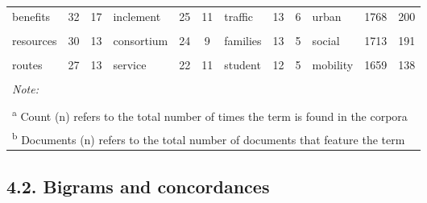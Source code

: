 \documentclass[]{elsarticle} %
\begin{document}
\begin{table}
{\begin{tabular}[t]{lcclcclcclcc}
benefits & 32 & 17 & inclement & 25 & 11 & traffic & 13 & 6 & urban & 1768 & 200\\
\addlinespace
\cellcolor{gray!6}{play} & \cellcolor{gray!6}{31} & \cellcolor{gray!6}{2} & \cellcolor{gray!6}{eligibility} & \cellcolor{gray!6}{24} & \cellcolor{gray!6}{11} & \cellcolor{gray!6}{support} & \cellcolor{gray!6}{13} & \cellcolor{gray!6}{6} & \cellcolor{gray!6}{home} & \cellcolor{gray!6}{1715} & \cellcolor{gray!6}{199}\\
resources & 30 & 13 & consortium & 24 & 9 & families & 13 & 5 & social & 1713 & 191\\
\cellcolor{gray!6}{healthy} & \cellcolor{gray!6}{29} & \cellcolor{gray!6}{16} & \cellcolor{gray!6}{region} & \cellcolor{gray!6}{23} & \cellcolor{gray!6}{10} & \cellcolor{gray!6}{way} & \cellcolor{gray!6}{12} & \cellcolor{gray!6}{5} & \cellcolor{gray!6}{different} & \cellcolor{gray!6}{1713} & \cellcolor{gray!6}{215}\\
routes & 27 & 13 & service & 22 & 11 & student & 12 & 5 & mobility & 1659 & 138\\
\cellcolor{gray!6}{lanes} & \cellcolor{gray!6}{26} & \cellcolor{gray!6}{3} & \cellcolor{gray!6}{•} & \cellcolor{gray!6}{21} & \cellcolor{gray!6}{1} & \cellcolor{gray!6}{region} & \cellcolor{gray!6}{12} & \cellcolor{gray!6}{4} & \cellcolor{gray!6}{significant} & \cellcolor{gray!6}{1650} & \cellcolor{gray!6}{208}\\
\bottomrule
\multicolumn{12}{l}{\rule{0pt}{1em}\textit{Note: }}\\
\multicolumn{12}{l}{\rule{0pt}{1em} }\\
\multicolumn{12}{l}{\rule{0pt}{1em}\textsuperscript{a} Count (n) refers to the total number of times the term is found in the corpora}\\
\multicolumn{12}{l}{\rule{0pt}{1em}\textsuperscript{b} Documents (n) refers to the total number of documents that feature the term}\\
\end{tabular}}
\end{table}

\hypertarget{bigrams-and-concordances}{%
\subsection{4.2. Bigrams and
concordances}\label{bigrams-and-concordances}}
\end{document}
